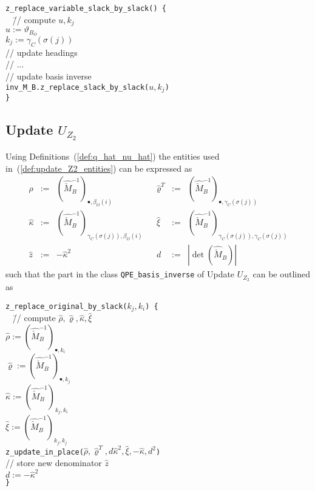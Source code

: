 \documentclass[a4paper]{article}
\begin{document}
\begin{tabbing}
\texttt{z\_replace\_variable\_slack\_by\_slack() \{} \\
\texttt{  } \= // compute $u, k_{j}$ \\
\> \texttt{$u:=\vartheta_{B_{O}}$} \\
\> \texttt{$k_{j}:=\gamma_{C}(\sigma(j))$} \\
\> // update headings \\
\> // ... \\
\> // update basis inverse \\
\> \texttt{inv\_M\_B.z\_replace\_slack\_by\_slack($u, k_{j}$)}
\\
\texttt{\}}
\end{tabbing}


\subsection{Update $U_{Z_{2}}$}
Using Definitions~(\ref{def:q_hat_nu_hat}) the entities used
in~(\ref{def:update_Z2_entities}) can be expressed as
\begin{equation}
\label{def:update_Z2_entities_prep}
\begin{array}{rclcrcl}
\hat{\rho}
&:=&
\left(
  \hat{\check{M}}_{B}^{-1}
\right)_{\bullet, \beta_{O}(i)}
&&
\hat{\varrho}^{T}
&:=&
\left(
  \hat{\check{M}}_{B}^{-1}
\right)_{\bullet, \gamma_{C}(\sigma(j))}
\\
\hat{\kappa}
&:=&
\left(
  \hat{\check{M}}_{B}^{-1}
\right)_{\gamma_{C}(\sigma(j)), \beta_{O}(i)}
&&
\hat{\xi}
&:=&
\left(
  \hat{\check{M}}_{B}^{-1}
\right)_{\gamma_{C}(\sigma(j)), \gamma_{C}(\sigma(j))}
\\
\hat{z}
&:=&
-\hat{\kappa}^{2}
&&
d
&:=&
\left|\det(\hat{\check{M}}_{B})\right|
\end{array}
\end{equation}
such that the part in the class \texttt{QPE\_basis\_inverse} of
Update $U_{Z_{2}}$ can be outlined as
\begin{tabbing}
\texttt{z\_replace\_original\_by\_slack($k_{j}, k_{i}$) \{} \\
\texttt{  } \= // compute $\hat{\rho}, \hat{\varrho}, \hat{\kappa},
\hat{\xi}$ \\
\> \texttt{$\hat{\rho}:=
  \left(\hat{\check{M}}_{B}^{-1}\right)_{\bullet, k_{i}}$} \\
\> \texttt{$\hat{\varrho}:=
  \left(\hat{\check{M}}_{B}^{-1}\right)_{\bullet, k_{j}}$} \\
\> \texttt{$\hat{\kappa}:=
  \left(\hat{\check{M}}_{B}^{-1}\right)_{k_{j}, k_{i}}$} \\
\> \texttt{$\hat{\xi}:=
  \left(\hat{\check{M}}_{B}^{-1}\right)_{k_{j}, k_{j}}$} \\    
\> \texttt{z\_update\_in\_place($\hat{\rho}, \hat{\varrho}^{T},
d\hat{\kappa}^{2}, \hat{\xi}, -\hat{\kappa}, d^{2}$)} \\
\> // store new denominator $\hat{z}$ \\
\> \texttt{$d:=-\hat{\kappa}^{2}$} \\
\texttt{\}}
\end{tabbing}
\end{document}
